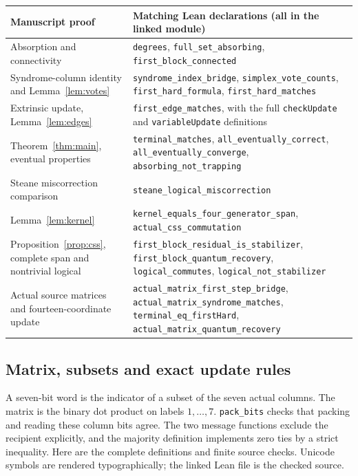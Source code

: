 \small
\begin{longtable}{p{}p{}}
\toprule Manuscript proof & Matching Lean declarations (all in the linked module)\\
\midrule\endhead
Absorption and connectivity & \texttt{degrees}, \texttt{full\_set\_absorbing}, \texttt{first\_block\_connected}\\
Syndrome-column identity and Lemma~\ref{lem:votes} & \texttt{syndrome\_index\_bridge}, \texttt{simplex\_vote\_counts}, \texttt{first\_hard\_formula}, \texttt{first\_hard\_matches}\\
Extrinsic update, Lemma~\ref{lem:edges} & \texttt{first\_edge\_matches}, with the full \texttt{checkUpdate} and \texttt{variableUpdate} definitions\\
Theorem~\ref{thm:main}, eventual properties & \texttt{terminal\_matches}, \texttt{all\_eventually\_correct}, \texttt{all\_eventually\_converge}, \texttt{absorbing\_not\_trapping}\\
Steane miscorrection comparison & \texttt{steane\_logical\_miscorrection}\\
Lemma~\ref{lem:kernel} & \texttt{kernel\_equals\_four\_generator\_span}, \texttt{actual\_css\_commutation}\\
Proposition~\ref{prop:css}, complete span and nontrivial logical & \texttt{first\_block\_residual\_is\_stabilizer}, \texttt{first\_block\_quantum\_recovery}, \texttt{logical\_commutes}, \texttt{logical\_not\_stabilizer}\\
Actual source matrices and fourteen-coordinate update & \texttt{actual\_matrix\_first\_step\_bridge}, \texttt{actual\_matrix\_syndrome\_matches}, \texttt{terminal\_eq\_firstHard}, \texttt{actual\_matrix\_quantum\_recovery}\\
\bottomrule
\end{longtable}
\normalsize


\subsection{Matrix, subsets and exact update rules}
A seven-bit word is the indicator of a subset of the seven actual columns.
The matrix is the binary dot product on labels $1,\ldots,7$.
\texttt{pack\_bits} checks that packing and reading these column bits agree.
The two message functions exclude the recipient explicitly, and the
majority definition implements zero ties by a strict inequality.
Here are the complete definitions and finite source checks. Unicode symbols are rendered typographically; the linked Lean file is the checked source.



